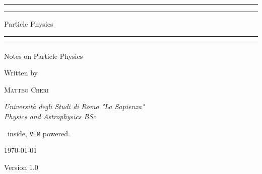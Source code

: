 \documentclass[../part.tex]{subfiles}
\begin{document}
\begin{titlepage}
	\scshape
	\begin{center}
	\rule{\textwidth}{1.6pt}\vspace*{-\baselineskip}\vspace*{2pt}
	\rule{\textwidth}{0.4pt}

	\vspace{0.75\baselineskip}

	{\Huge Particle Physics\\}

	\vspace{0.75\baselineskip}
	\rule{\textwidth}{0.4pt}\vspace*{-\baselineskip}\vspace{3.2pt}
	\rule{\textwidth}{1.6pt}
	\vspace{2\baselineskip}

	Notes on Particle Physics

	\vspace*{6.5\baselineskip}

	Written by

	\vspace*{0.5\baselineskip}

	{\scshape\Large  Matteo Cheri}

	\vspace{0.5\baselineskip}

	\textit{Università degli Studi di Roma "La Sapienza"\\ Physics and Astrophysics BSc}

	\vfill

	\LaTeXe\ inside, \texttt{ViM} powered.

	\vspace{0.7\baselineskip}

	\today

	\vspace{0.5\baselineskip}

	{\Large Version 1.0}
	\end{center}
\end{titlepage}
\end{document}
